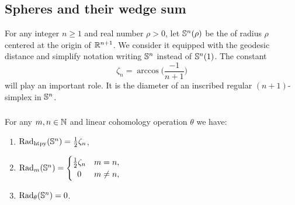 
\subsection{Spheres and their wedge sum}\label{ss:Sn}\label{sub:Sn and wedge sum}

For any integer $n \geq 1$ and real number $\rho > 0$, let $\mathbb{S}^n(\rho)$ be the  of radius $\rho$ centered at the origin of $\mathbb{R}^{n+1}$.
We consider it equipped with the geodesic distance and simplify notation writing \(\mathbb{S}^n\) instead of \(\mathbb{S}^n(1)\).
The constant 
\[\zeta_n = \arccos\Big(\frac{-1}{n+1}\Big)\] 
will play an important role.
It is the diameter of an inscribed regular $(n+1)$-simplex in $\mathbb{S}^n$. 

\subsubsection{}\label{subsub:critical values of Sn}

\medskip\proposition
For any $m,n \in \mathbb{N}$ and linear cohomology operation $\theta$ we have:
\begin{enumerate}
	\item \(\mathrm{Rad}_{\mathrm{htpy}}(\mathbb{S}^n) = \frac{1}{2}\zeta_n\),
	\item \(\firstdeath{m}{\bS^n} =
	\begin{cases}
		\frac{1}{2}\zeta_n & m = n, \\
		\hfil 0 & m \neq n,
	\end{cases}\)
	\item \(\mathrm{Rad}_{\theta}(\mathbb{S}^n) = 0\).
\end{enumerate}

